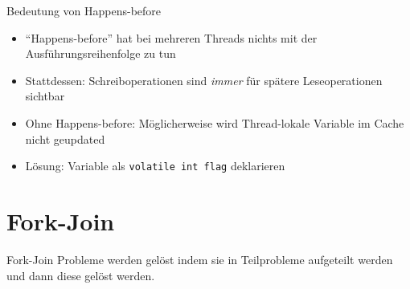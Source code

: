 \documentclass{beamer}
\newcommand{\code}[1]{
	\begin{mdframed}
		
	\end{mdframed}
}
\begin{document}
\begin{frame}{Bedeutung von Happens-before}
  \code{code/happens-before2.java}

  {\small
  \begin{itemize}
    \item \enquote{Happens-before} hat bei mehreren Threads nichts mit der Ausführungsreihenfolge zu tun
    \item Stattdessen: Schreiboperationen sind \emph{immer} für spätere Leseoperationen sichtbar
    \item Ohne Happens-before: Möglicherweise wird Thread-lokale Variable im Cache nicht geupdated
    \item Lösung: Variable als \texttt{volatile int flag} deklarieren
  \end{itemize}
  }
\end{frame}

\section{Fork-Join}

\begin{frame}{Fork-Join}
    Probleme werden gelöst indem sie in Teilprobleme aufgeteilt werden und dann diese gelöst werden.
\end{frame}
\end{document}
